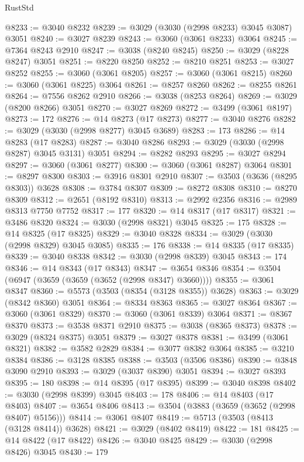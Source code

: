 \begin{lexlean}{RustStd}
\begin{coremodule}
@8233 := @3040 @8232
@8239 := @3029 (@3030 (@2998 @8233) @3045 @3087) @3051
@8240 := @3027 @8239
@8243 := @3060 (@3061 @8233) @3064
@8245 := @7364 @8243 @2910
@8247 := @3038 (@8240 @8245)
@8250 := @3029 (@8228 @8247) @3051
@8251 := @8220 @8250
@8252 := @8210 @8251
@8253 := @3027 @8252
@8255 := @3060 (@3061 @8205)
@8257 := @3060 (@3061 @8215)
@8260 := @3060 (@3061 @8225) @3064
@8261 := @8257 @8260
@8262 := @8255 @8261
@8264 := @7556 @8262 @2910
@8266 := @3038 (@8253 @8264)
@8269 := @3029 (@8200 @8266) @3051
@8270 := @3027 @8269
@8272 := @3499 (@3061 @8197)
@8273 := 172
@8276 := @14 @8273 (@17 @8273)
@8277 := @3040 @8276
@8282 := @3029 (@3030 (@2998 @8277) @3045 @3689)
@8283 := 173
@8286 := @14 @8283 (@17 @8283)
@8287 := @3040 @8286
@8293 := @3029 (@3030 (@2998 @8287) @3045 @3131) @3051
@8294 := @8282 @8293
@8295 := @3027 @8294
@8297 := @3060 (@3061 @8277)
@8300 := @3060 (@3061 @8287) @3064
@8301 := @8297 @8300
@8303 := @3916 @8301 @2910
@8307 := @3503 (@3636 (@8295 @8303)) @3628
@8308 := @3784 @8307
@8309 := @8272 @8308
@8310 := @8270 @8309
@8312 := @2651 (@8192 @8310)
@8313 := @2992 @2356
@8316 := @2989 @8313 @7750 @7752
@8317 := 177
@8320 := @14 @8317 (@17 @8317)
@8321 := @3486 @8320
@8324 := @3030 (@2998 @8321) @3045
@8325 := 175
@8328 := @14 @8325 (@17 @8325)
@8329 := @3040 @8328
@8334 := @3029 (@3030 (@2998 @8329) @3045 @3085)
@8335 := 176
@8338 := @14 @8335 (@17 @8335)
@8339 := @3040 @8338
@8342 := @3030 (@2998 @8339) @3045
@8343 := 174
@8346 := @14 @8343 (@17 @8343)
@8347 := @3654 @8346
@8354 := @3504 (@6947 (@3659 (@3659 (@3652 (@2998 @8347) @3660))))
@8355 := @3061 @8347
@8360 := @5573 (@3503 (@8354 (@3128 @8355)) @3628)
@8363 := @3029 (@8342 @8360) @3051
@8364 := @8334 @8363
@8365 := @3027 @8364
@8367 := @3060 (@3061 @8329)
@8370 := @3060 (@3061 @8339) @3064
@8371 := @8367 @8370
@8373 := @3538 @8371 @2910
@8375 := @3038 (@8365 @8373)
@8378 := @3029 (@8324 @8375) @3051
@8379 := @3027 @8378
@8381 := @3499 (@3061 @8321)
@8382 := @3582 @2829
@8384 := @3077 @8382 @3064
@8385 := @3210 @8384
@8386 := @3128 @8385
@8388 := @3503 (@3506 @8386)
@8390 := @3848 @3090 @2910
@8393 := @3029 (@3037 @8390) @3051
@8394 := @3027 @8393
@8395 := 180
@8398 := @14 @8395 (@17 @8395)
@8399 := @3040 @8398
@8402 := @3030 (@2998 @8399) @3045
@8403 := 178
@8406 := @14 @8403 (@17 @8403)
@8407 := @3654 @8406
@8413 := @3504 (@3883 (@3659 (@3652 (@2998 @8407) @5156)))
@8414 := @3061 @8407
@8419 := @5713 (@3503 (@8413 (@3128 @8414)) @3628)
@8421 := @3029 (@8402 @8419)
@8422 := 181
@8425 := @14 @8422 (@17 @8422)
@8426 := @3040 @8425
@8429 := @3030 (@2998 @8426) @3045
@8430 := 179

\end{coremodule}
\end{lexlean}
